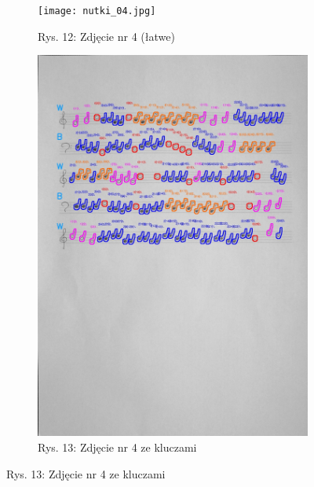 \documentclass[11pt]{article}
\begin{document}
\begin{figure}[H]
    \centering
    \captionsetup[subfigure]{labelformat=empty}
    \begin{subfigure}[b]{.5\textwidth}
        \centering
        \graphicspath{ {Resources/} }
        \texttt{[image: nutki\_04.jpg]}
        \caption{Rys. 12: Zdjęcie nr 4 (łatwe)}
        \label{figsub1}
    \end{subfigure}%
    \begin{subfigure}[b]{.5\textwidth}
        \centering
        \graphicspath{ {keys/} }
        \includegraphics[width=.9\linewidth]{image_4.jpg}
        \caption{Rys. 13: Zdjęcie nr 4 ze kluczami}
        \label{figsub2}
    \end{subfigure}
    
    \label{figwykKlucze01}
\end{figure}
\end{document}
